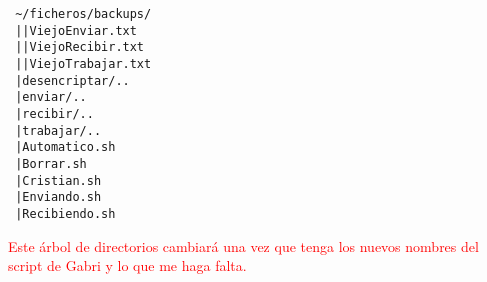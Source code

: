 \texttt{
\textasciitilde/ficheros/backups/\\
\textcolor{white}{.}\hspace{3.15cm}|\hspace{1.8cm}|ViejoEnviar.txt\\
\textcolor{white}{.}\hspace{3.15cm}|\hspace{1.8cm}|ViejoRecibir.txt\\
\textcolor{white}{.}\hspace{3.15cm}|\hspace{1.8cm}|ViejoTrabajar.txt\\
\textcolor{white}{.}\hspace{3.15cm}|desencriptar/..\\
\textcolor{white}{.}\hspace{3.15cm}|enviar/..\\
\textcolor{white}{.}\hspace{3.15cm}|recibir/..\\
\textcolor{white}{.}\hspace{3.15cm}|trabajar/..\\
\textcolor{white}{.}\hspace{3.15cm}|Automatico.sh\\
\textcolor{white}{.}\hspace{3.15cm}|Borrar.sh\\
\textcolor{white}{.}\hspace{3.15cm}|Cristian.sh\\
\textcolor{white}{.}\hspace{3.15cm}|Enviando.sh\\
\textcolor{white}{.}\hspace{3.15cm}|Recibiendo.sh\\
}

\textcolor{red}{Este árbol de directorios cambiará una vez que tenga los nuevos nombres del script de Gabri y lo que me haga falta.}

